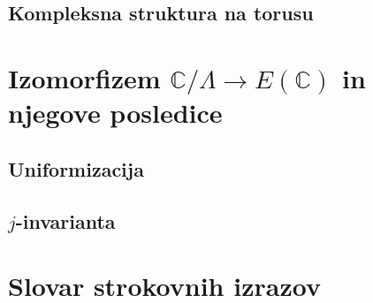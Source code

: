 \documentclass[mat1]{fmfdelo}
\newcommand{\C}{\mathbb C}
\newcommand{\PC}{P^2(\mathbb C)}
\theoremstyle{definition}
\begin{document}






\subsection{Kompleksna struktura na torusu}
\break




\section{Izomorfizem \texorpdfstring{$\C/\Lambda \to E(\C)$}{} in njegove posledice} \label{poglavje izomorfizem}

\subsection{Uniformizacija}

\begin{izrek}
    \label{uniformizacija}
\end{izrek}

\subsection{$j$-invarianta}
 

\break

\section*{Slovar strokovnih izrazov}

\geslo{}{}
\geslo{}{}
\end{document}
